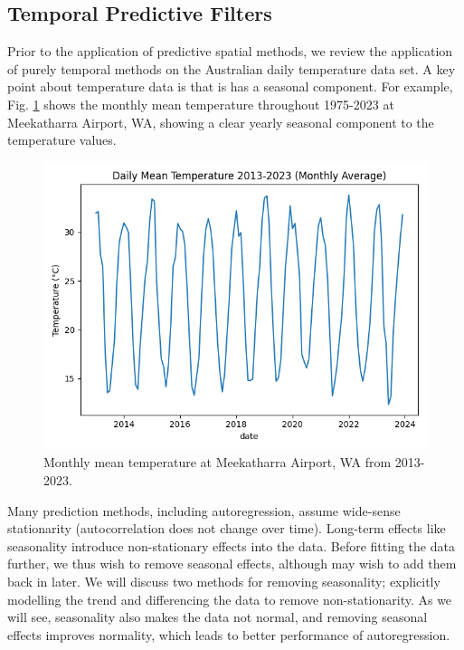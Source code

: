 \documentclass[12pt,a4paper]{article} %
\begin{document}
\subsection{Temporal Predictive Filters}
\label{subsec:prediction}
Prior to the application of predictive spatial methods, we review the application of purely temporal methods on the Australian daily temperature data set. A key point about temperature data is that is has a seasonal component. For example, Fig. \ref{fig:7045_monthly} shows the monthly mean temperature throughout 1975-2023 at Meekatharra Airport, WA, showing a clear yearly seasonal component to the temperature values.

\begin{figure}[!ht]
    \centering
    \includegraphics[width=0.7\linewidth]{7045_monthly.png}
    \caption{Monthly mean temperature at Meekatharra Airport, WA from 2013-2023.}
    \label{fig:7045_monthly}
\end{figure}

Many prediction methods, including autoregression, assume wide-sense stationarity (autocorrelation does not change over time). Long-term effects like seasonality introduce non-stationary effects into the data. Before fitting the data further, we thus wish to remove seasonal effects, although may wish to add them back in later. We will discuss two methods for removing seasonality; explicitly modelling the trend and differencing the data to remove non-stationarity. As we will see, seasonality also makes the data not normal, and removing seasonal effects improves normality, which leads to better performance of autoregression.
\end{document}
